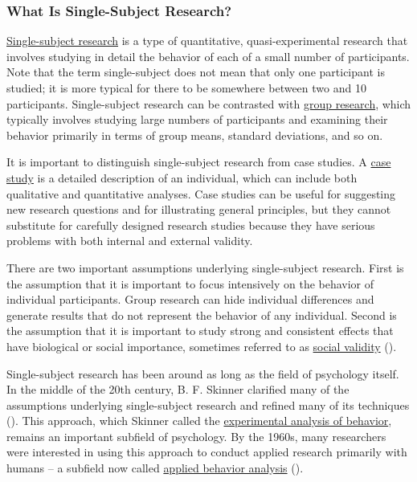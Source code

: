 \documentclass[
]{krantz}
\begin{document}
\subsubsection*{What Is Single-Subject Research?}\label{what-is-single-subject-research}


\hyperref[single-subject-research]{Single-subject research} is a type of quantitative, quasi-experimental research that involves studying in detail the behavior of each of a small number of participants. Note that the term single-subject does not mean that only one participant is studied; it is more typical for there to be somewhere between two and 10 participants. Single-subject research can be contrasted with \hyperref[group-research]{group research}, which typically involves studying large numbers of participants and examining their behavior primarily in terms of group means, standard deviations, and so on.

It is important to distinguish single-subject research from case studies. A \hyperref[case-study]{case study} is a detailed description of an individual, which can include both qualitative and quantitative analyses. Case studies can be useful for suggesting new research questions and for illustrating general principles, but they cannot substitute for carefully designed research studies because they have serious problems with both internal and external validity.

There are two important assumptions underlying single-subject research. First is the assumption that it is important to focus intensively on the behavior of individual participants. Group research can hide individual differences and generate results that do not represent the behavior of any individual. Second is the assumption that it is important to study strong and consistent effects that have biological or social importance, sometimes referred to as \hyperref[social-validity]{social validity} ().

Single-subject research has been around as long as the field of psychology itself. In the middle of the 20th century, B. F. Skinner clarified many of the assumptions underlying single-subject research and refined many of its techniques (). This approach, which Skinner called the \hyperref[experimental-analysis-of-behavior]{experimental analysis of behavior}, remains an important subfield of psychology. By the 1960s, many researchers were interested in using this approach to conduct applied research primarily with humans -- a subfield now called \hyperref[applied-behavior-analysis]{applied behavior analysis} ().
\end{document}
